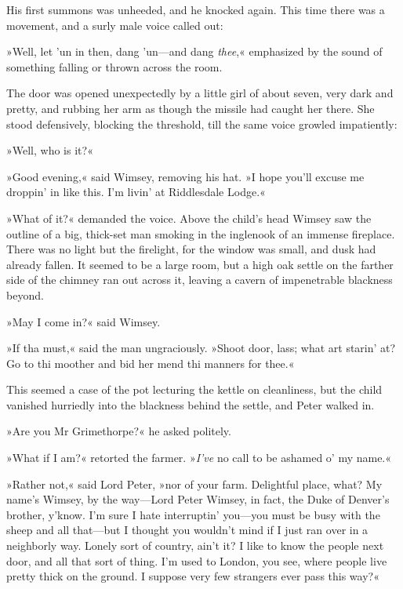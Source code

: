 His first summons was unheeded, and he knocked again. This time there was a movement, and a surly male voice called out:

»Well, let 'un in then, dang 'un\allowbreak---\allowbreak and dang \textit{thee},« emphasized by the sound of something falling or thrown across the room.

The door was opened unexpectedly by a little girl of about seven, very dark and pretty, and rubbing her arm as though the missile had caught her there. She stood defensively, blocking the threshold, till the same voice growled impatiently:

»Well, who is it?«

»Good evening,« said Wimsey, removing his hat. »I hope you'll excuse me droppin' in like this. I'm livin' at Riddlesdale Lodge.«

»What of it?« demanded the voice. Above the child's head Wimsey saw the outline of a big, thick-set man smoking in the inglenook of an immense fireplace. There was no light but the firelight, for the window was small, and dusk had already fallen. It seemed to be a large room, but a high oak settle on the farther side of the chimney ran out across it, leaving a cavern of impenetrable blackness beyond.

»May I come in?« said Wimsey.

»If tha must,« said the man ungraciously. »Shoot door, lass; what art starin' at? Go to thi moother and bid her mend thi manners for thee.«

This seemed a case of the pot lecturing the kettle on cleanliness, but the child vanished hurriedly into the blackness behind the settle, and Peter walked in.

»Are you Mr Grimethorpe?« he asked politely.

»What if I am?« retorted the farmer. »\textit{I've} no call to be ashamed o' my name.«

»Rather not,« said Lord Peter, »nor of your farm. Delightful place, what? My name's Wimsey, by the way\allowbreak---\allowbreak Lord Peter Wimsey, in fact, the Duke of Denver's brother, y'know. I'm sure I hate interruptin' you\allowbreak---\allowbreak you must be busy with the sheep and all that\allowbreak---\allowbreak but I thought you wouldn't mind if I just ran over in a neighborly way. Lonely sort of country, ain't it? I like to know the people next door, and all that sort of thing. I'm used to London, you see, where people live pretty thick on the ground. I suppose very few strangers ever pass this way?«

